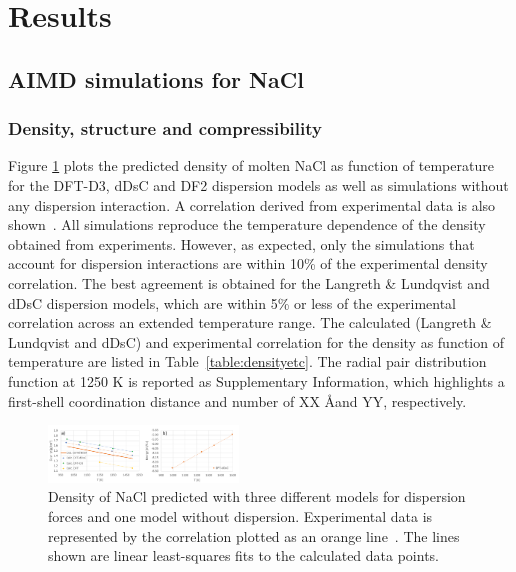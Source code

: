 \documentclass[preprint,3p,10pt,twocolumn,number,sort&compress]{elsarticle}
\begin{document}
\section{Results}
\label{sec:results}
\subsection{AIMD simulations for NaCl}
\subsubsection{Density, structure and compressibility}
Figure \ref{fig:NaCldensity} plots the predicted density of molten NaCl as function of temperature for the DFT-D3, dDsC and DF2 dispersion models as well as simulations without any dispersion interaction. 
A correlation derived from experimental data is also shown~\cite{}. All simulations reproduce the temperature dependence of the density obtained from experiments. However, as expected, only the simulations that account for dispersion interactions are within 10\% of the experimental density correlation. The best agreement is obtained for the Langreth \& Lundqvist and dDsC dispersion models, which are within 5\% or less of the experimental correlation across an extended temperature range. The calculated (Langreth \& Lundqvist and dDsC) and experimental correlation for the density as function of temperature are listed in Table~\ref{table:densityetc}. The radial pair distribution function at 1250 K is reported as Supplementary Information, which highlights a first-shell coordination distance and number of XX \AA and YY, respectively.   

\begin{figure}[htb]
\centering
\includegraphics[width=0.45\textwidth]{./figures/FIG2.pdf}
\caption{Density of NaCl predicted with three different models for dispersion forces and one model without dispersion. Experimental data is represented by the correlation plotted as an orange line~\cite{}. %
The lines shown are linear least-squares fits to the calculated data points.} 
\label{fig:NaCldensity}
\end{figure}
\end{document}
